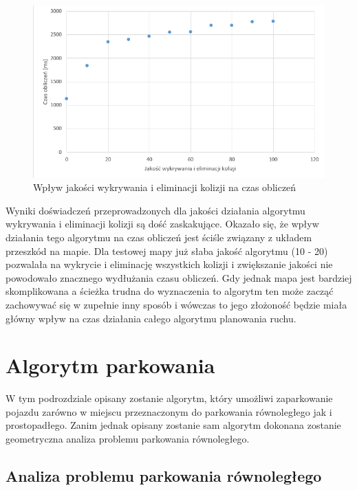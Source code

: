 \documentclass[a4paper,11pt,twoside]{report}
\theoremstyle{definition}
\begin{document}
\begin{figure}[h!]
\centering
\includegraphics[scale=0.8]{chartCollisionDetectionQuality}
\caption[Wpływ jakości wykrywania i eliminacji kolizji na czas obliczeń]{Wpływ jakości wykrywania i eliminacji kolizji na czas obliczeń}
\end{figure}

Wyniki doświadczeń przeprowadzonych dla jakości działania algorytmu wykrywania i eliminacji kolizji są dość zaskakujące. Okazało się, że wpływ działania tego algorytmu na czas obliczeń jest ściśle związany z układem przeszkód na mapie. Dla testowej mapy już słaba jakość algorytmu (10 - 20) pozwalała na wykrycie i eliminację wszystkich kolizji i zwiększanie jakości nie powodowało znacznego wydłużania czasu obliczeń. Gdy jednak mapa jest bardziej skomplikowana a ścieżka trudna do wyznaczenia to algorytm ten może zacząć zachowywać się w zupełnie inny sposób i wówczas to jego złożoność będzie miała główny wpływ na czas działania całego algorytmu planowania ruchu. 

\newpage

\section{Algorytm parkowania}

W tym podrozdziale opisany zostanie algorytm, który umożliwi zaparkowanie pojazdu zarówno w miejscu przeznaczonym do parkowania równoległego jak i prostopadłego. Zanim jednak opisany zostanie sam algorytm dokonana zostanie geometryczna analiza problemu parkowania równoległego.

\subsection{Analiza problemu parkowania równoległego}
\end{document}
